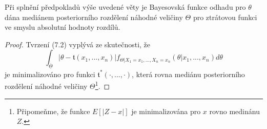 \begin{corollary}
Při splnění předpokladů výše uvedené věty je Bayesovská funkce odhadu pro $\theta$ dána mediánem posteriorního rozdělení náhodné veličiny $\Theta$ pro ztrátovou funkci ve smyslu absolutní hodnoty rozdílů.
\end{corollary}

\begin{proof}
Tvrzení (7.2) vyplývá ze skutečnosti, že
\begin{equation*}
\int_{\overline{\underline{\Theta}}}|\theta - \mathfrak{t}(x_1, ..., x_n)| f_{\Theta|X_1 = x_1, ..., X_n = x_n}(\theta|x_1, ..., x_n) d \theta
\end{equation*}
je minimalizováno pro funkci $\mathfrak{t}^*(\cdot, ..., \cdot)$, která rovna mediánu posteriorního rozdělení náhodné veličiny $\Theta$\footnote{Připomeňme, že funkce $E[|Z - x|]$ je minimalizována pro $x$ rovno medinánu $Z$.}.
\end{proof}

